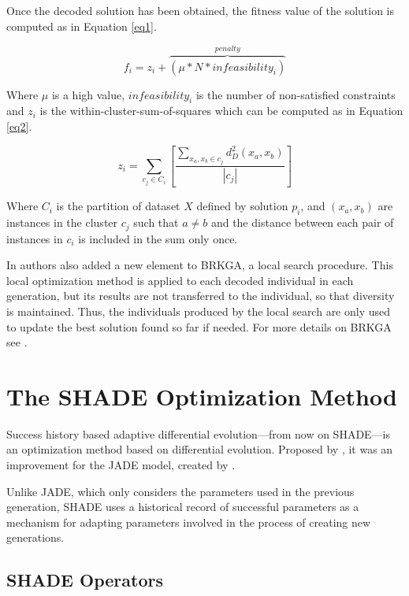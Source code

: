 \documentclass[review]{elsarticle}
\begin{document}
Once the decoded solution has been obtained, the fitness value of the solution is computed as in Equation \eqref{eq1}.

\begin{equation}
f_i = z_i + \overbrace{(\mu * N * {infeasibility}_i)}^{penalty}
\label{eq1}
\end{equation}

Where $\mu$ is a high value, $infeasibility_i$ is the number of non-satisfied constraints and $z_i$ is the within-cluster-sum-of-squares which can be computed as in Equation \eqref{eq2}.

\begin{equation}
z_i = \sum_{c_j \in C_i} \left[ \frac{\sum_{x_a, x_b \in c_j} d_D^2(x_a,x_b)}{|c_j|}\right]
\label{eq2}
\end{equation}

Where $C_i$ is the partition of dataset $X$ defined by solution $p_i$, and $(x_a, x_b)$ are instances in the cluster $c_j$ such that $a \neq b$ and the distance between each pair of instances in $c_i$ is included in the sum only once.

In \cite{de2017comparison} authors also added a new element to BRKGA, a local search procedure. This local optimization method is applied to each decoded individual in each generation, but its results are not transferred to the individual, so that diversity is maintained. Thus, the individuals produced by the local search are only used to update the best solution found so far if needed. For more details on BRKGA see \cite{de2017comparison}.

\section{The SHADE Optimization Method} \label{sec:SHADE}

Success history based adaptive differential evolution---from now on SHADE---is an optimization method based on differential evolution. Proposed by \cite{tanabe2013success}, it was an improvement for the JADE model, created by \cite{zhang2009jade}.

Unlike JADE, which only considers the parameters used in the previous generation, SHADE uses a historical record of successful parameters as a mechanism for adapting parameters involved in the process of creating new generations.

\subsection{SHADE Operators}
\end{document}
